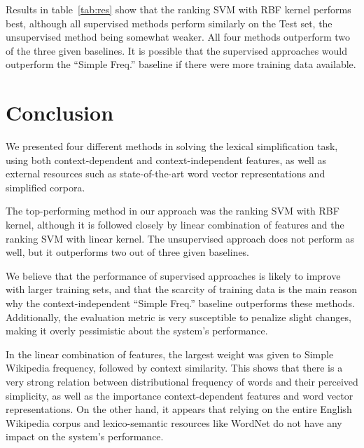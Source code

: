 \documentclass[10pt, a4paper]{article}
\begin{document}
Results in table~\ref{tab:res} show that the ranking SVM with RBF kernel performs best, although all supervised methods perform similarly on the Test set, the unsupervised method being somewhat weaker. All four methods outperform two of the three given baselines. It is possible that the supervised approaches would outperform the ``Simple Freq.'' baseline if there were more training data available.

\section{Conclusion}

We presented four different methods in solving the lexical simplification task, using both context-dependent and context-independent features, as well as external resources such as state-of-the-art word vector representations and simplified corpora.

The top-performing method in our approach was the ranking SVM with RBF kernel, although it is followed closely by linear combination of features and the ranking SVM with linear kernel. The unsupervised approach does not perform as well, but it outperforms two out of three given baselines.

We believe that the performance of supervised approaches is likely to improve with larger training sets, and that the scarcity of training data is the main reason why the context-independent ``Simple Freq.'' baseline outperforms these methods. Additionally, the evaluation metric  is very susceptible to penalize slight changes, making it overly pessimistic about the system's performance.

In the linear combination of features, the largest weight was given to Simple Wikipedia frequency, followed by context similarity. This shows that there is a very strong relation between distributional frequency of words and their perceived simplicity, as well as the importance context-dependent features and word vector representations. On the other hand, it appears that relying on the entire English Wikipedia corpus and lexico-semantic resources like WordNet do not have any impact on the system's performance.



\end{document}
